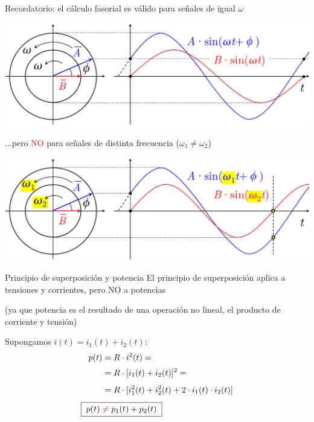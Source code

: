 \documentclass[aspectratio=169, usenames,svgnames,dvipsnames]{beamer}
\begin{document}
\begin{frame}{Recordatorio: \hspace{3mm}el cálculo fasorial es válido para señales de igual $\omega$} \label{diapo:fasores_distintaFrecuencia}

    \begin{center}
        \includegraphics[height=0.6\textheight]{../figs/Fasor_distintasFrecuencias_1.pdf}
    \end{center}
\end{frame}


\begin{frame}{...pero \textcolor{red}{NO} para señales de distinta frecuencia ($\omega_1 \neq \omega_2$)}

    \begin{center}
        \includegraphics[height=0.6\textheight]{../figs/Fasor_distintasFrecuencias_2.pdf}
    \end{center}
\end{frame}


\begin{frame}{Principio de superposición y potencia}
    El principio de superposición aplica a tensiones y corrientes, pero \alert{NO a potencias}
    
    (ya que potencia es el resultado de una \alert{operación no lineal}, el producto de corriente y tensión)

    \vspace{5mm}
    
    Supongamos \(i(t) = i_1(t) + i_2(t)\):
    \begin{align*}
      p(t) &= R \cdot i^2(t) =\\[2pt]
           &= R \cdot [i_1(t) + i_2(t)]^2 =\\[4pt]
           &=R \cdot [i_1^2(t) + i_2^2(t) + 2\cdot i_1(t) \cdot i_2(t)]\\[4pt] %
     \Aboxed{\; p(t) \; &\textcolor{red}{\neq} \; p_1(t) + p_2(t) \;}
    \end{align*}
\end{frame}
\end{document}
